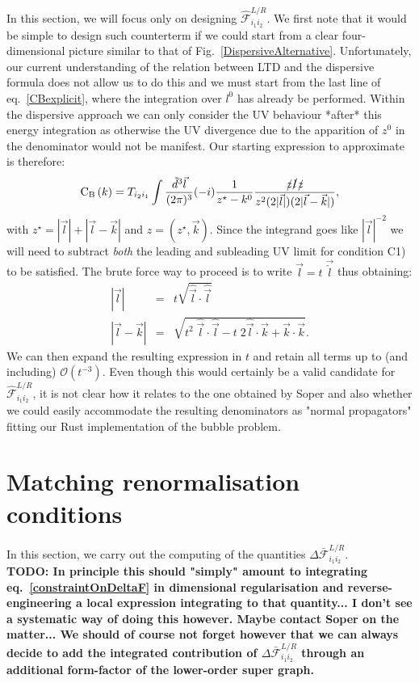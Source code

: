 \documentclass[11pt]{article}
\begin{document}
In this section, we will focus only on designing $\mathcal{\hat{F}}^{L/R}_{i_1i_2}$.
We first note that it would be simple to design such counterterm if we could start from a clear four-dimensional picture similar to that of Fig.~\ref{DispersiveAlternative}.
Unfortunately, our current understanding of the relation between LTD and the dispersive formula does not allow us to do this and we must start from the last line of eq.~\ref{CBexplicit}, where the integration over $l^0$ has already be performed.
Within the dispersive approach we can only consider the UV behaviour *after* this energy integration as otherwise the UV divergence due to the apparition of $z^0$ in the denominator would not be manifest.
Our starting expression to approximate is therefore:
\begin{equation}
\textrm{C}_\textrm{B}\left(k \right) =
T_{i_2 i_1}  \int \frac{\tilde{d}^3 \vec{l}}{(2\pi)^3} (-i) \frac{1}{z^\star-k^0} \frac{\slashed{z}\slashed{l}\slashed{z}}{z^2 (2 |\vec{l}|) (2 |\vec{l}-\vec{k}|)},
\end{equation}
with $z^\star = |\vec{l}|+|\vec{l}-\vec{k}|$ and $z=(z^\star,\vec{k})$. Since the integrand goes like $|\vec{l}|^{-2}$ we will need to subtract \emph{both} the leading and subleading UV limit for condition C1) to be satisfied.
The brute force way to proceed is to write $\vec{l}=t\;\vec{\hat{l}}$ thus obtaining:
\begin{eqnarray}
 |\vec{l}|&=&t\sqrt{\hat{\vec{l}} \cdot  \hat{\vec{l}}} \\
 |\vec{l}-\vec{k}|&=&\sqrt{t^2\; \hat{\vec{l}} \cdot  \hat{\vec{l}}-t\; 2\hat{\vec{l}} \cdot \vec{k} + \vec{k} \cdot \vec{k}}.
 \end{eqnarray}
We can then expand the resulting expression in $t$ and retain all terms up to (and including) $\mathcal{O}(t^{-3})$.
Even though this would certainly be a valid candidate for $\mathcal{\hat{F}}^{L/R}_{i_1i_2}$, it is not clear how it relates to the one obtained by Soper and also whether we could easily accommodate the resulting denominators as "normal propagators" fitting our Rust implementation of the bubble problem.

\section{Matching renormalisation conditions}
In this section, we carry out the computing of the quantities $\Delta \mathcal{\bar{F}}^{L/R}_{i_1i_2}$.\\

{\bf{TODO: In principle this should "simply" amount to integrating eq.~\ref{constraintOnDeltaF} in dimensional regularisation and reverse-engineering a local expression integrating to that quantity... I don't see a systematic way of doing this however. Maybe contact Soper on the matter...
We should of course not forget however that we can always decide to add the integrated contribution of $\Delta \mathcal{\bar{F}}^{L/R}_{i_1i_2}$ through an additional form-factor of the lower-order super graph.
}}
\end{document}
